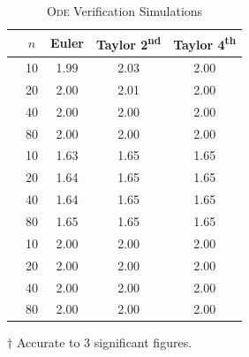 \documentclass[a4paper,12pt,twocolumn]{article}
\begin{document}
\begin{table}[h]
    \centering
    \footnotesize
    \caption{\textsc{Ode} Verification Simulations}
    \label{table:ode}
    \begin{threeparttable}
        \begin{tabular}{
            @{}
            l
            S[table-format=2]
            S[table-format=1.2]
            S[table-format=1.2]
            S[table-format=1.2]
            @{}
        }
            \toprule
            & $n$
            & {\bf Euler\tnote{$\dagger$}}
            & {\bf Taylor 2\textsuperscript{nd}\tnote{$\dagger$}}
            & {\bf Taylor 4\textsuperscript{th}\tnote{$\dagger$}} \\
            \midrule
            & 10 & 1.99 & 2.03 & 2.00 \\
            & 20 & 2.00 & 2.01 & 2.00 \\
            & 40 & 2.00 & 2.00 & 2.00 \\
            & 80 & 2.00 & 2.00 & 2.00 \\
            \midrule
            & 10 & 1.63 & 1.65 & 1.65 \\
            & 20 & 1.64 & 1.65 & 1.65 \\
            & 40 & 1.64 & 1.65 & 1.65 \\
            & 80 & 1.65 & 1.65 & 1.65 \\
            \midrule
            & 10 & 2.00 & 2.00 & 2.00 \\
            & 20 & 2.00 & 2.00 & 2.00 \\
            & 40 & 2.00 & 2.00 & 2.00 \\
            & 80 & 2.00 & 2.00 & 2.00 \\
            \bottomrule
        \end{tabular}
        \begin{tablenotes}
            \item[$\dagger$] Accurate to 3 significant figures.
        \end{tablenotes}
    \end{threeparttable}
\end{table}
\end{document}
